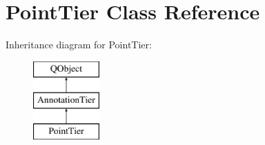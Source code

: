 \hypertarget{class_point_tier}{}\section{Point\+Tier Class Reference}
\label{class_point_tier}
Inheritance diagram for Point\+Tier\+:\begin{figure}[H]
\begin{center}
\leavevmode
\includegraphics[height=3.000000cm]{class_point_tier}
\end{center}
\end{figure}
